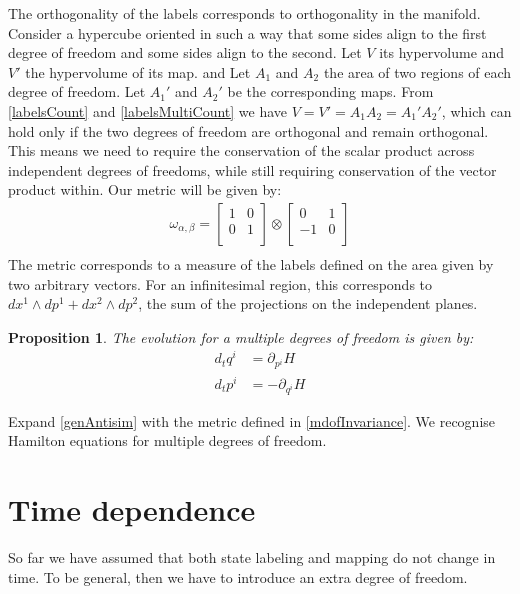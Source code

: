 \documentclass[twocolumn,floatfix,nofootinbib]{revtex4}   %
\theoremstyle{theorem}
\newtheorem{prop}[thm]{Proposition}
\theoremstyle{definition}
\begin{document}
The orthogonality of the labels corresponds to orthogonality in the manifold. Consider a hypercube oriented in such a way that some sides align to the first degree of freedom and some sides align to the second. Let $V$ its hypervolume and $V'$ the hypervolume of its map. and Let $A_1$ and $A_2$ the area of two regions of each degree of freedom. Let $A_1'$ and $A_2'$ be the corresponding maps. From \ref{labelsCount} and \ref{labelsMultiCount} we have $V=V'=A_1A_2=A_1'A_2'$, which can hold only if the two degrees of freedom are orthogonal and remain orthogonal. This means we need to require the conservation of the scalar product across independent degrees of freedoms, while still requiring conservation of the vector product within. Our metric will be given by:
\begin{align*}
\omega_{\alpha, \beta} =  \left[
  \begin{array}{cc}
    1 & 0 \\
    0 & 1 \\
  \end{array}
\right] \otimes \left[
  \begin{array}{cc}
    0 & 1 \\
    -1 & 0 \\
  \end{array}
\right] \\
\end{align*}
The metric corresponds to a measure of the labels defined on the area given by two arbitrary vectors. For an infinitesimal region, this corresponds to $dx^1 \wedge dp^1 + dx^2 \wedge dp^2$, the sum of the projections on the independent planes.

\begin{prop}\label{mdofHam}
The evolution for a multiple degrees of freedom is given by:
\begin{align*}
d_{t}q^i &= \partial_{p^i} H \\
d_{t}p^i &= - \partial_{q^i} H
\end{align*}
\end{prop}

Expand \ref{genAntisim} with the metric defined in \ref{mdofInvariance}. We recognise Hamilton equations for multiple degrees of freedom.

\section{Time dependence}
So far we have assumed that both state labeling and mapping do not change in time. To be general, then we have to introduce an extra degree of freedom.
\end{document}

